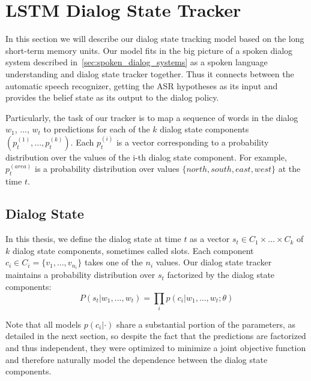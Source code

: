 \documentclass[10pt,twocolumn]{article}
\begin{document}
\section{LSTM Dialog State Tracker}
\label{sec:lstm_dialog_state_tracker}
In this section we will describe our dialog state tracking model based on the long short-term memory units. Our model fits in the big picture of a spoken dialog system described in~\autoref{sec:spoken_dialog_systems} as a spoken language understanding and dialog state tracker together. Thus it connects between the automatic speech recognizer, getting the ASR hypotheses as its input and provides the belief state as its output to the dialog policy.

Particularly, the task of our tracker is to map a sequence of words in the dialog $w_1$, ..., $w_t$ to predictions for each of the $k$ dialog state components $(p^{(1)}_t, ..., p^{(k)}_t)$. Each $p^{(i)}_t$ is a vector corresponding to a probability distribution over the values of the i-th dialog state component. For example, $p^{(area)}_t$ is a probability distribution over values $\{north, south, east, west\}$ at the time $t$.

\subsection{Dialog State}
In this thesis, we define the dialog state at time $t$ as a vector $s_t \in C_1 \times ... \times C_k$ of $k$ dialog state components, sometimes called slots. Each component $c_i \in C_i=\{v_1, ..., v_{n_i}\}$ takes one of the $n_i$ values. Our dialog state tracker maintains a probability distribution over $s_t$ factorized by the dialog state components:
$$P(s_t|w_1, ..., w_t)=\prod_i p(c_i|w_1, ..., w_t; \theta)$$

Note that all models $p(c_i|\cdot)$ share a substantial portion of the parameters, as detailed in the next section, so despite the fact that the predictions are factorized and thus independent, they were optimized to minimize a joint objective function and therefore naturally model the dependence between the dialog state components.
\end{document}
